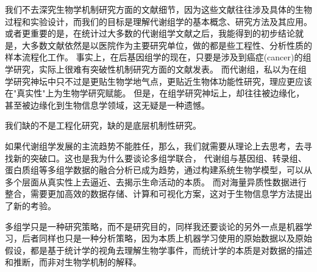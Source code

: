 \documentclass[12pt,hyperref,a4paper,UTF8]{ctexart}
\begin{document}
我们不去深究生物学机制研究方面的文献细节，因为这些文献往往涉及具体的生物过程和实验设计，而我们的目标是理解代谢组学的基本概念、研究方法及其应用。或者更重要的是，在统计过大多数的代谢组学文献之后，我能得到的初步结论就是，大多数文献依然是以医院作为主要研究单位，做的都是些工程性、分析性质的样本流程化工作。
事实上，在后基因组学的现在，只要是涉及到癌症(cancer)的组学研究，实际上很难有突破性机制研究方面的文献发表。
而代谢组，私以为在组学研究神坛中只不过是更贴生物学地气点，更贴近生物体功能性研究，理应更应该在"真实性"上为生物学研究赋能。
但是，在组学研究神坛上，却往往被边缘化，甚至被边缘化到生物信息学领域，这无疑是一种遗憾。

我们缺的不是工程化研究，缺的是底层机制性研究。

如果代谢组学发展的主流趋势不能胜任，那么，我们就需要从理论上去思考，去寻找新的突破口。这也是我为什么要谈论多组学联合，
代谢组与基因组、转录组、蛋白质组等多组学数据的融合分析已成为趋势，通过构建系统生物学模型，可以从多个层面从真实性上去逼近、去揭示生命活动的本质。
而对海量异质性数据进行整合，需要更加高效的数据存储、计算和可视化方案，这对于生物信息学方法提出了新的考验\cite{12}。

多组学只是一种研究策略，而不是研究目的，同样我还要谈论的另外一点是机器学习，后者同样也只是一种分析策略，因为本质上机器学习使用的原始数据以及原始假设，都是基于统计学的视角去理解生物学事件，而统计学的本质是对数据的描述和推断，而非对生物学机制的解释。


\end{document}
